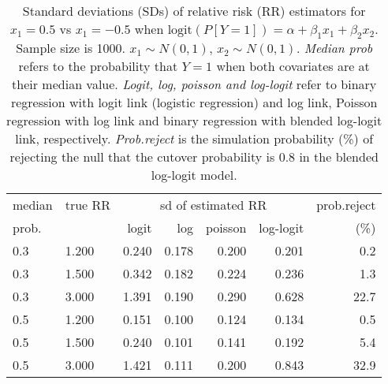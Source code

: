 \documentclass[12pt,a4paper]{article}
\begin{document}
\begin{table}[H] 
\small\sf\centering 
\caption{Standard deviations (SDs) of relative risk (RR) estimators for $x_1=0.5$ vs $x_1=-0.5$ when $\mbox{logit}(P[Y=1])=\alpha+\beta_1 x_1 + \beta_2 x_2$. Sample size is 1000. $x_1 \sim $$N(0,1)$, $x_2 \sim N(0,1)$. {\it Median prob} refers to the probability that $Y=1$ when both covariates are at their median value. {\it Logit, log, poisson and log-logit} refer to binary regression with logit link (logistic regression) and log link, Poisson regression with log link and binary regression with blended log-logit link, respectively. {\it Prob.reject} is the simulation probability (\%) of rejecting the null that the cutover probability is $0.8$ in the blended log-logit model.} 
\begin{tabular}{llrrrrr} 
\toprule 
median & true RR & \multicolumn{4}{c}{sd of estimated RR} & prob.reject \\ 
prob. & & logit & log & poisson & log-logit  & (\%) \\ \midrule 
0.3 & 1.200 & 0.240 & 0.178 & 0.200 & 0.201 &  0.2 \\  
0.3 & 1.500 & 0.342 & 0.182 & 0.224 & 0.236 &  1.3 \\  
0.3 & 3.000 & 1.391 & 0.190 & 0.290 & 0.628 & 22.7 \\  
0.5 & 1.200 & 0.151 & 0.100 & 0.124 & 0.134 &  0.5 \\  
0.5 & 1.500 & 0.240 & 0.101 & 0.141 & 0.192 &  5.4 \\  
0.5 & 3.000 & 1.421 & 0.111 & 0.200 & 0.843 & 32.9 \\  
\bottomrule 
\end{tabular} 
\end{table} 
\end{document}
